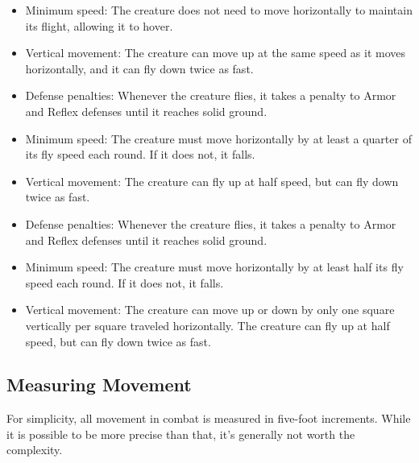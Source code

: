             \begin{itemize}
                \item Minimum speed: The creature does not need to move horizontally to maintain its flight, allowing it to hover.
                \item Vertical movement: The creature can move up at the same speed as it moves horizontally, and it can fly down twice as fast.
            \end{itemize}

            \begin{itemize}
                \item Defense penalties: Whenever the creature flies, it takes a  penalty to Armor and Reflex defenses until it reaches solid ground.
                \item Minimum speed: The creature must move horizontally by at least a quarter of its fly speed each round. If it does not, it falls.
                \item Vertical movement: The creature can fly up at half speed, but can fly down twice as fast.
            \end{itemize}

            \begin{itemize}
                \item Defense penalties: Whenever the creature flies, it takes a  penalty to Armor and Reflex defenses until it reaches solid ground.
                \item Minimum speed: The creature must move horizontally by at least half its fly speed each round. If it does not, it falls.
                \item Vertical movement: The creature can move up or down by only one square vertically per square traveled horizontally.
                    The creature can fly up at half speed, but can fly down twice as fast.
            \end{itemize}

    \subsection{Measuring Movement}

        For simplicity, all movement in combat is measured in five-foot increments.
        While it is possible to be more precise than that, it's generally not worth the complexity.

